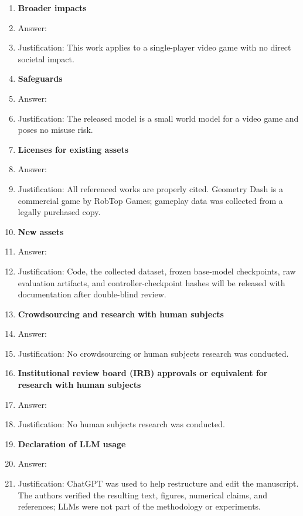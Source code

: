 \begin{enumerate}
\item {\bf Broader impacts}
    \item[] Answer: \answerNA{}
    \item[] Justification: This work applies to a single-player video game with no direct societal impact.

\item {\bf Safeguards}
    \item[] Answer: \answerNA{}
    \item[] Justification: The released model is a small world model for a video game and poses no misuse risk.

\item {\bf Licenses for existing assets}
    \item[] Answer: \answerYes{}
    \item[] Justification: All referenced works are properly cited. Geometry Dash is a commercial game by RobTop Games; gameplay data was collected from a legally purchased copy.

\item {\bf New assets}
    \item[] Answer: \answerNo{}
    \item[] Justification: Code, the collected dataset, frozen base-model checkpoints, raw evaluation artifacts, and controller-checkpoint hashes will be released with documentation after double-blind review.

\item {\bf Crowdsourcing and research with human subjects}
    \item[] Answer: \answerNA{}
    \item[] Justification: No crowdsourcing or human subjects research was conducted.

\item {\bf Institutional review board (IRB) approvals or equivalent for research with human subjects}
    \item[] Answer: \answerNA{}
    \item[] Justification: No human subjects research was conducted.

\item {\bf Declaration of LLM usage}
    \item[] Answer: \answerYes{}
    \item[] Justification: ChatGPT was used to help restructure and edit the manuscript. The authors verified the resulting text, figures, numerical claims, and references; LLMs were not part of the methodology or experiments.

\end{enumerate}

